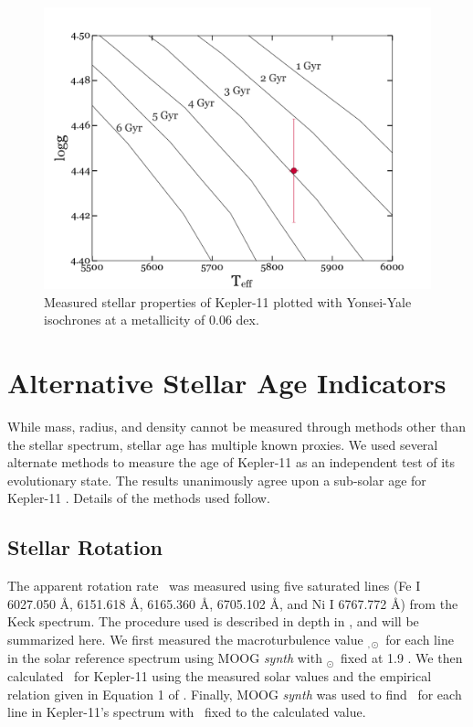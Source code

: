 \documentclass[oneside]{emulateapj}
\begin{document}
\begin{figure}
\centering
\includegraphics[width=\columnwidth]{isochrones}
\caption{Measured stellar properties of Kepler-11 plotted with Yonsei-Yale isochrones at a metallicity of 0.06 dex.}
\label{fig:isochrones}
\end{figure}

\section{Alternative Stellar Age Indicators}
\label{s:ages}

While mass, radius, and density cannot be measured through methods other than the stellar spectrum, stellar age has multiple known proxies. We used several alternate methods to measure the age of Kepler-11 as an independent test of its evolutionary state. The results unanimously agree upon a sub-solar age for Kepler-11 . Details of the methods used follow.

\subsection{Stellar Rotation}

The apparent rotation rate \vsini\ was measured using five saturated lines (Fe I 6027.050 \r{A}, 6151.618 \r{A}, 6165.360 \r{A}, 6705.102 \r{A}, and Ni I 6767.772 \r{A}) from the Keck spectrum. The procedure used is described in depth in \citet{dosSantos2016}, and will be summarized here. We first measured the macroturbulence value \vmacro$_{,\odot}$\ for each line in the solar reference spectrum using MOOG \textit{synth} with \vsini$_{\odot}$\ fixed at 1.9 \kms. We then calculated \vmacro\ for Kepler-11 using the measured solar values and the empirical relation given in Equation 1 of \citet{dosSantos2016}. Finally, MOOG \textit{synth} was used to find \vsini\ for each line in Kepler-11's spectrum with \vmacro\ fixed to the calculated value.
\end{document}
